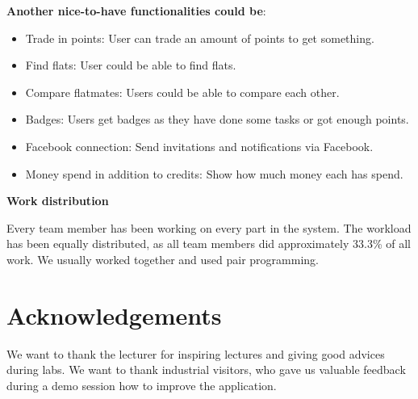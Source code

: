 \documentclass{sig-alt-release2}
\begin{document}
\vspace{5 mm} \noindent \textbf{Another nice-to-have functionalities could be}:
\begin{itemize}
\item Trade in points: User can trade an amount of points to get something.
\item Find flats: User could be able to find flats.
\item Compare flatmates: Users could be able to compare each other.
\item Badges: Users get badges as they have done some tasks or got enough points.
\item Facebook connection: Send invitations and notifications via Facebook.
\item Money spend in addition to credits: Show how much money each has spend.
\end{itemize}

\noindent \textbf{Work distribution}

Every team member has been working on every part in the system. The workload has
been equally distributed, as all team members did approximately 33.3\% of all work.
We usually worked together and used pair programming.
 

\section{Acknowledgements}

We want to thank the lecturer for inspiring lectures and giving good advices during labs.
We want to thank industrial visitors, who gave us valuable feedback during a demo session how to improve the application.




\appendix
\end{document}
